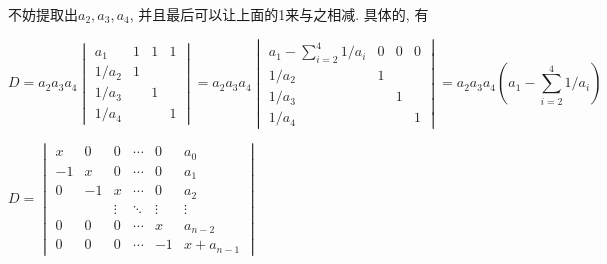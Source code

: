 \begin{sol*}
不妨提取出$a_{2},a_{3},a_{4}$, 并且最后可以让上面的1来与之相减. 具体的, 有

\[
D=a_{2}a_{3}a_{4}\begin{vmatrix}a_{1} & 1 & 1 & 1\\
1/a_{2} & 1\\
1/a_{3} &  & 1\\
1/a_{4} &  &  & 1
\end{vmatrix}=a_{2}a_{3}a_{4}\begin{vmatrix}a_{1}-\sum_{i=2}^{4}1/a_{i} & 0 & 0 & 0\\
1/a_{2} & 1\\
1/a_{3} &  & 1\\
1/a_{4} &  &  & 1
\end{vmatrix}=a_{2}a_{3}a_{4}\left(a_{1}-\sum_{i=2}^{4}1/a_{i}\right)
\]
\end{sol*}
\begin{problem}
\label{prob:poly-jordan-form}$D=\begin{vmatrix}x & 0 & 0 & \cdots & 0 & a_{0}\\
-1 & x & 0 & \cdots & 0 & a_{1}\\
0 & -1 & x & \cdots & 0 & a_{2}\\
 &  & \vdots & \ddots & \vdots & \vdots\\
0 & 0 & 0 & \cdots & x & a_{n-2}\\
0 & 0 & 0 & \cdots & -1 & x+a_{n-1}
\end{vmatrix}$
\end{problem}

